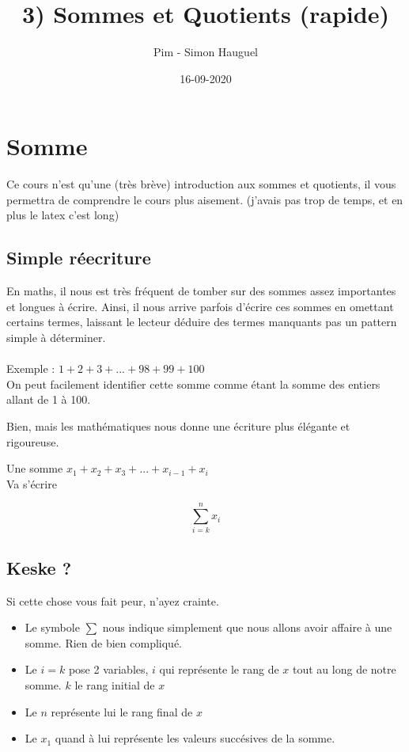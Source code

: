 \documentclass{article}
\title{3) Sommes et Quotients (rapide)}
\author{Pim - Simon Hauguel}
\date{16-09-2020}
\begin{document}
\maketitle

\section{Somme}
Ce cours n'est qu'une (très brève) introduction aux sommes et quotients, il vous permettra de comprendre le cours plus aisement. (j'avais pas trop de temps, et en plus le latex c'est long)
\subsection{Simple réecriture}

En maths, il nous est très fréquent de tomber sur des sommes assez importantes et longues à écrire. Ainsi, il nous arrive parfois d'écrire ces sommes en omettant certains termes, laissant le lecteur déduire des termes manquants pas un pattern simple à déterminer.\\\\
Exemple : $1 + 2 + 3 + ... + 98 + 99 + 100$\\
On peut facilement identifier cette somme comme étant la somme des entiers allant de 1 à 100.

Bien, mais les mathématiques nous donne une écriture plus élégante et rigoureuse.

Une somme $x_{1} + x_{2} + x_{3}+ ... + x_{i-1} + x_{i}$\\
Va s'écrire

\begin{center}

  \[\sum_{i=k}^n x_{i}\]

\end{center}

\subsection{Keske ?}

Si cette chose vous fait peur, n'ayez crainte.\\
\begin{itemize}
  \item Le symbole $\sum$ nous indique simplement que nous allons avoir affaire à une somme. Rien de bien compliqué.
  \item Le $i=k$ pose 2 variables, $i$ qui représente le rang de $x$ tout au long de notre somme. $k$ le rang initial de $x$
  \item Le $n$ représente lui le rang final de $x$
  \item Le $x_{1}$ quand à lui représente les valeurs succésives de la somme.
\end{itemize}
\end{document}
